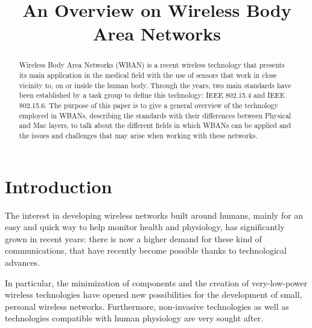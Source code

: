 \documentclass[conference]{IEEEtran}
\begin{document}
\title{An Overview on Wireless Body Area Networks}

\author{
	
}

\maketitle

\begin{abstract}
Wireless Body Area Networks (WBAN) is a recent wireless technology that presents its main application in the medical field with the use of sensors that work in close vicinity to, on or inside the human body. Through the years, two main standards have been established by a task group to define this technology: IEEE 802.15.4 and IEEE 802.15.6. The purpose of this paper is to give a general overview of the technology employed in WBANs, describing the standards with their differences between Physical and Mac layers, to talk about the different fields in which WBANs can be applied and the issues and challenges that may arise when working with these networks.
\end{abstract}
\hfill
%

\section{Introduction}
The interest in developing wireless networks built around humans, mainly for an easy and quick way to help monitor health and physiology, has significantly grown in recent years: there is now a higher demand for these kind of communications, that have recently become possible thanks to technological advances.

In particular, the minimization of components and the creation of very-low-power wireless technologies have opened new possibilities for the development of small, personal wireless networks. Furthermore, non-invasive technologies as well as technologies compatible with human physiology are very sought after.
\end{document}
